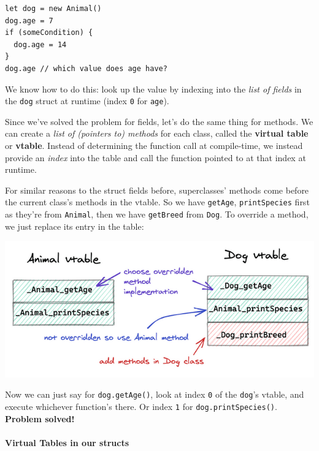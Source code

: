 
\begin{verbatim}
let dog = new Animal()
dog.age = 7
if (someCondition) {
  dog.age = 14
}
dog.age // which value does age have?
\end{verbatim}

We know how to do this: look up the value by indexing into the
\emph{list of fields} in the \texttt{dog} struct at runtime (index
\texttt{0} for \texttt{age}).

Since we've solved the problem for fields, let's do the same thing for
methods. We can create a \emph{list of (pointers to) methods} for each
class, called the \textbf{virtual table} or \textbf{vtable}. Instead of
determining the function call at compile-time, we instead provide an
\emph{index} into the table and call the function pointed to at that
index at runtime.

For similar reasons to the struct fields before, superclasses' methods
come before the current class's methods in the vtable. So we have
\texttt{getAge}, \texttt{printSpecies} first as they're from
\texttt{Animal}, then we have \texttt{getBreed} from \texttt{Dog}. To
override a method, we just replace its entry in the table:

{
\href{https://mukulrathi.com/static/c32dbd45d3466359a751c298568c0f5f/bfe41/vtable.png}{{}
\includegraphics[width=\linewidth]{11_files/vtable.png}} }

Now we can just say for \texttt{dog.getAge()}, look at index \texttt{0}
of the \texttt{dog}'s vtable, and execute whichever function's there. Or
index \texttt{1} for \texttt{dog.printSpecies()}. \textbf{Problem
solved!}

\hypertarget{virtual-tables-in-our-structs}{%
\paragraph{\texorpdfstring{\protect\hyperlink{virtual-tables-in-our-structs}{}Virtual
Tables in our
structs}{Virtual Tables in our structs}}\label{virtual-tables-in-our-structs}}

